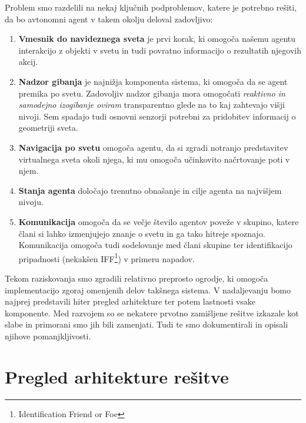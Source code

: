 \documentclass[a4paper,10pt]{article}
\begin{document}
Problem smo razdelili na nekaj ključnih podproblemov, katere je potrebno rešiti, da bo avtonomni agent v takem okolju deloval zadovljivo:
\begin{enumerate}
  \item \textbf{Vmesnik do navideznega sveta} je prvi korak, ki omogoča našemu agentu interakcijo z objekti v svetu in tudi povratno informacijo o rezultatih njegovih akcij.
  
  \item \textbf{Nadzor gibanja} je najnižja komponenta sistema, ki omogoča da se agent premika po svetu. Zadovoljiv nadzor gibanja mora omogočati \textit{reaktivno in samodejno izogibanje oviram} transparentno glede na to kaj zahtevajo višji nivoji. Sem spadajo tudi osnovni senzorji potrebni za pridobitev informacij o geometriji sveta.
  
  \item \textbf{Navigacija po svetu} omogoča agentu, da si zgradi notranjo predstavitev virtualnega sveta okoli njega, ki mu omogoča učinkovito načrtovanje poti v njem.
  
  \item \textbf{Stanja agenta} določajo trenutno obnašanje in cilje agenta na najvišjem nivoju.
  
  \item \textbf{Komunikacija} omogoča da se večje število agentov poveže v skupino, katere člani si lahko izmenjujejo znanje o svetu in ga tako hitreje spoznajo. Komunikacija omogoča tudi sodelovanje med člani skupine ter identifikacijo pripadnosti (nekakšen IFF\footnote{Identification Friend or Foe}) v primeru napadov.
\end{enumerate}

Tekom raziskovanja smo zgradili relativno preprosto ogrodje, ki omogoča implementacijo zgoraj omenjenih delov takšnega sistema. V nadaljevanju bomo najprej predstavili hiter pregled arhitekture ter potem lastnosti vsake komponente. Med razvojem so se nekatere prvotno zamišljene rešitve izkazale kot slabe in primorani smo jih bili zamenjati. Tudi te smo dokumentirali in opisali njihove pomanjkljivosti.

\section{Pregled arhitekture rešitve}
\end{document}
